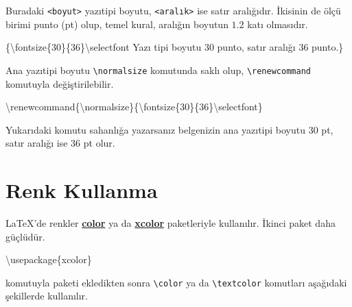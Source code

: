 \documentclass[
  letterpaper,
  DIV=11,
  numbers=noendperiod]{scrreprt}
\newenvironment{Shaded}{\begin{snugshade}}{\end{snugshade}}
\newcommand{\BuiltInTok}[1]{\textcolor[rgb]{0.00,0.23,0.31}{#1}}
\newcommand{\ExtensionTok}[1]{\textcolor[rgb]{0.00,0.23,0.31}{#1}}
\newcommand{\FunctionTok}[1]{\textcolor[rgb]{0.28,0.35,0.67}{#1}}
\newcommand{\NormalTok}[1]{\textcolor[rgb]{0.00,0.23,0.31}{#1}}
\begin{document}
Buradaki \texttt{\textless{}boyut\textgreater{}} yazıtipi boyutu,
\texttt{\textless{}aralık\textgreater{}} ise satır aralığıdır. İkisinin
de ölçü birimi punto (pt) olup, temel kural, aralığın boyutun \(1.2\)
katı olmasıdır.

\begin{Shaded}
\begin{Highlighting}[]
\NormalTok{\{}\FunctionTok{\textbackslash{}fontsize}\NormalTok{\{30\}\{36\}}\FunctionTok{\textbackslash{}selectfont}
\NormalTok{Yazı tipi boyutu 30 punto,}
\NormalTok{satır aralığı 36 punto.\}}
\end{Highlighting}
\end{Shaded}

Ana yazıtipi boyutu \texttt{\textbackslash{}normalsize} komutunda saklı
olup, \texttt{\textbackslash{}renewcommand} komutuyla değiştirilebilir.

\begin{Shaded}
\begin{Highlighting}[]
\FunctionTok{\textbackslash{}renewcommand}\NormalTok{\{}\ExtensionTok{\textbackslash{}normalsize}\NormalTok{\}\{}\FunctionTok{\textbackslash{}fontsize}\NormalTok{\{30\}\{36\}}\FunctionTok{\textbackslash{}selectfont}\NormalTok{\}}
\end{Highlighting}
\end{Shaded}

Yukarıdaki komutu sahanlığa yazarsanız belgenizin ana yazıtipi boyutu 30
pt, satır aralığı ise 36 pt olur.

\hypertarget{renk-kullanma}{%
\section{Renk Kullanma}\label{renk-kullanma}}

{\LaTeX}'de renkler
\href{http://ftp.cc.uoc.gr/mirrors/CTAN/macros/latex/required/graphics/color.pdf}{\textbf{color}}
ya da
\href{http://ftp.ntua.gr/mirror/ctan/macros/latex/contrib/xcolor/xcolor.pdf}{\textbf{xcolor}}
paketleriyle kullanılır. İkinci paket daha güçlüdür.

\begin{Shaded}
\begin{Highlighting}[]
\BuiltInTok{\textbackslash{}usepackage}\NormalTok{\{}\ExtensionTok{xcolor}\NormalTok{\}}
\end{Highlighting}
\end{Shaded}

komutuyla paketi ekledikten sonra \texttt{\textbackslash{}color} ya da
\texttt{\textbackslash{}textcolor} komutları aşağıdaki şekillerde
kullanılır.
\end{document}
